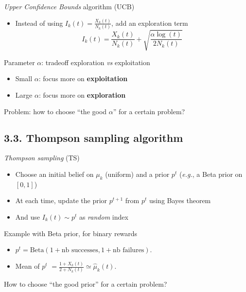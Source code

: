 \documentclass[12pt,english,ignorenonframetext,]{beamer}
\providecommand{\tightlist}{%
  \setlength{\itemsep}{0pt}\setlength{\parskip}{0pt}}
\begin{document}
\begin{frame}{%
\protect\hypertarget{first-example-of-algorithm-upper-confidence-bounds-algorithm-ucb}{%
\emph{Upper Confidence Bounds} algorithm
(UCB)}}

\begin{itemize}
\tightlist
\item
  Instead of using \(I_k(t) = \frac{X_k(t)}{N_k(t)}\), add an
  exploration term
  \[ I_k(t) = \frac{X_k(t)}{N_k(t)} + \sqrt{\frac{\alpha \log(t)}{2 N_k(t)}} \]
\end{itemize}

\begin{block}{Parameter \(\alpha\): tradeoff exploration \emph{vs}
exploitation}

\begin{itemize}
\tightlist
\item
  Small \(\alpha\): focus more on \textbf{exploitation}
\item
  Large \(\alpha\): focus more on \textbf{exploration}
\end{itemize}

\end{block}

Problem: how to choose ``the good \(\alpha\)'' for a certain problem?

\end{frame}



\subsection{\hfill{}3.3. Thompson sampling algorithm \hfill{}}

\begin{frame}{%
\protect\hypertarget{second-example-of-algorithm-thompson-sampling-ts}{%
\emph{Thompson sampling} (TS)}}

\begin{itemize}
\tightlist
\item
  Choose an initial belief on \(\mu_k\) (uniform) and a prior \(p^t\)
  (\emph{e.g.}, a Beta prior on \([0,1]\))
\item
  At each time, update the prior \(p^{t+1}\) from \(p^t\) using Bayes
  theorem
\item
  And use \(I_k(t) \sim p^t\) as \emph{random} index
\end{itemize}

\begin{block}{Example with Beta prior, for binary rewards}

\begin{itemize}
\tightlist
\item
  \(p^t = \mathrm{Beta}(1 + \text{nb successes}, 1 + \text{nb failures})\).
\item
  Mean of \(p^t\)
  \(= \frac{1 + X_k(t)}{2 + N_k(t)} \simeq \hat{\mu}_k(t)\).
\end{itemize}

\end{block}

How to choose ``the good prior'' for a certain problem?

\end{frame}
\end{document}
